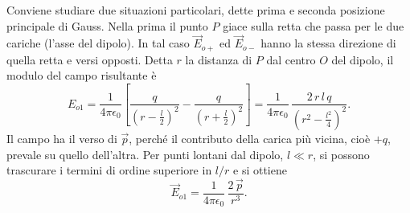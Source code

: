 \documentclass[11pt,a4paper]{article}
\begin{document}
Conviene studiare due situazioni particolari, dette prima e seconda posizione principale di Gauss. Nella prima il punto $P$ giace sulla retta che passa per le due cariche (l'asse del dipolo). In tal caso $\vec{E}_{o+}$ ed $\vec{E}_{o-}$ hanno la stessa direzione di quella retta e versi opposti.
Detta $r$ la distanza di $P$ dal centro $O$ del dipolo, il modulo del campo risultante è
\begin{equation}
	E_{o1}=\frac{1}{4\pi\epsilon_{0}}\left[\frac{q}{\left(r-\frac{l}{2}\right)^{2}}-\frac{q}{\left(r+\frac{l}{2}\right)^{2}}\right]=\frac{1}{4\pi\epsilon_{0}}\,\frac{2\,r\,l\,q}{\left(r^{2}-\frac{l^{2}}{4}\right)^{2}}.
\end{equation}
Il campo ha il verso di $\vec{p}$, perché il contributo della carica più vicina, cioè $+q$, prevale su quello dell'altra. Per punti lontani dal dipolo, $l\ll r$, si possono trascurare i termini di ordine superiore in $l/r$ e si ottiene
\begin{equation}
	\vec{E}_{o1}=\frac{1}{4\pi\epsilon_{0}}\,\frac{2\,\vec{p}}{r^{3}}.
\end{equation}
\end{document}
